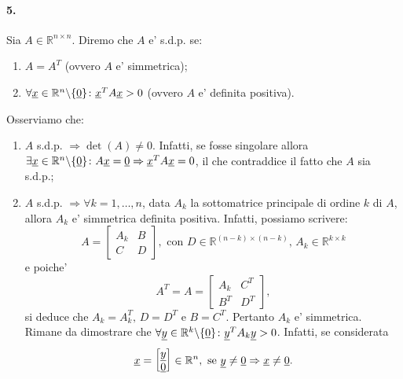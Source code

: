 \paragraph{5.} Sia $A\in\mathbb{R}^{n\times n}$. Diremo che $A$ e' s.d.p. se:
\begin{enumerate}
	\item $A=A^T$ (ovvero $A$ e' simmetrica);
	\item $\forall\uline x\in\mathbb{R}^n\backslash\{\uline 0\}\colon \uline x^T A \uline x > 0$ (ovvero $A$ e' definita positiva).
\end{enumerate}
Osserviamo che:
\begin{enumerate}
	\item $A$ s.d.p. $\Rightarrow\det(A)\neq 0$. Infatti, se fosse \gls{singolare} allora $\exists\uline x\in\mathbb{R}^n\backslash\{\uline 0\}\colon A\uline x = \uline 0 \Rightarrow \uline x^T A \uline x = 0$, il che contraddice il fatto che $A$ sia s.d.p.;
	\item $A$ s.d.p. $\Rightarrow \forall k=1,\hdots, n$, data $A_k$ la sottomatrice principale di ordine $k$ di $A$, allora $A_k$ e' simmetrica definita positiva. Infatti, possiamo scrivere:
	\begin{equation*}
		A=\left[
		\begin{array}{c|c}
			A_k & B\\
			\hline
			C & D
		\end{array}
		\right], \text{ con } D\in\mathbb R^{(n-k)\times (n-k)},\, A_k\in\mathbb{R}^{k\times k}
	\end{equation*}
	e poiche'
	\begin{equation*}
		A^T=A=\left[
		\begin{array}{c|c}
			A_k & C^T\\
			\hline
			B^T & D^T
		\end{array}
		\right],
	\end{equation*}
	si deduce che $A_k=A_k^T,\, D=D^T$ e $B = C^T$. Pertanto $A_k$ e' simmetrica.\\
	Rimane da dimostrare che $\forall\uline y\in\mathbb{R}^k\backslash\{\uline 0\}\colon\uline y^T A_k \uline y > 0$. Infatti, se considerata
	\begin{equation*}
		\uline x = 
		\begin{bmatrix}
			\uline y\\
			\uline 0
		\end{bmatrix}\in\mathbb{R}^n, \text{ se } \uline y\neq\uline 0 \Rightarrow\uline x \neq \uline 0.
	\end{equation*}

\end{enumerate}
